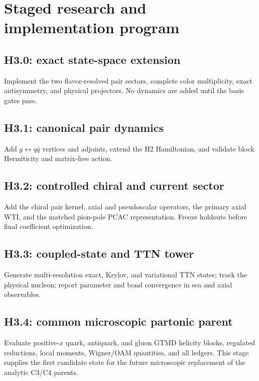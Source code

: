 \documentclass[11pt]{article}
\begin{document}
\section{Staged research and implementation program}
\label{sec:stages}

\subsection{H3.0: exact state-space extension}

Implement the two flavor-resolved pair sectors, complete color multiplicity,
exact antisymmetry, and physical projectors.  No dynamics are added until the
basis gates pass.

\subsection{H3.1: canonical pair dynamics}

Add \(g\leftrightarrow q\bar q\) vertices and adjoints, extend the H2
Hamiltonian, and validate block Hermiticity and matrix-free action.

\subsection{H3.2: controlled chiral and current sector}

Add the chiral pair kernel, axial and pseudoscalar operators, the primary
axial WTI, and the matched pion-pole PCAC representation.  Freeze holdouts
before final coefficient optimization.

\subsection{H3.3: coupled-state and TTN tower}

Generate multi-resolution exact, Krylov, and variational TTN states; track the
physical nucleon; report parameter and bond convergence in sea and axial
observables.

\subsection{H3.4: common microscopic partonic parent}

Evaluate positive-\(x\) quark, antiquark, and gluon GTMD helicity blocks,
regulated reductions, local moments, Wigner/OAM quantities, and all ledgers.
This stage supplies the first candidate state for the future microscopic
replacement of the analytic C3/C4 parents.
\end{document}
